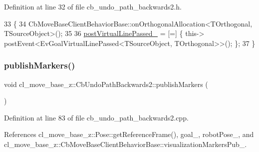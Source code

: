 Definition at line 32 of file cb\+\_\+undo\+\_\+path\+\_\+backwards2.\+h.


\begin{DoxyCode}
33   \{
34     CbMoveBaseClientBehaviorBase::onOrthogonalAllocation<TOrthogonal, TSourceObject>();
35 
36     \hyperlink{classcl__move__base__z_1_1CbUndoPathBackwards2_a2405e8194c63dce4462b6d4910031fe8}{postVirtualLinePassed\_} = [=] \{ this->
      postEvent<EvGoalVirtualLinePassed<TSourceObject, TOrthogonal>>(); \};
37   \}
\end{DoxyCode}
\mbox{\label{classcl__move__base__z_1_1CbUndoPathBackwards2_afaa039c78eb70ba012d86d8c77b9828c}} 
\subsubsection{\texorpdfstring{publish\+Markers()}{publishMarkers()}}
{\footnotesize\ttfamily void cl\+\_\+move\+\_\+base\+\_\+z\+::\+Cb\+Undo\+Path\+Backwards2\+::publish\+Markers (\begin{DoxyParamCaption}{ }\end{DoxyParamCaption})\hspace{0.3cm}{\ttfamily [private]}}



Definition at line 83 of file cb\+\_\+undo\+\_\+path\+\_\+backwards2.\+cpp.



References cl\+\_\+move\+\_\+base\+\_\+z\+::\+Pose\+::get\+Reference\+Frame(), goal\+\_\+, robot\+Pose\+\_\+, and cl\+\_\+move\+\_\+base\+\_\+z\+::\+Cb\+Move\+Base\+Client\+Behavior\+Base\+::visualization\+Markers\+Pub\+\_\+.


